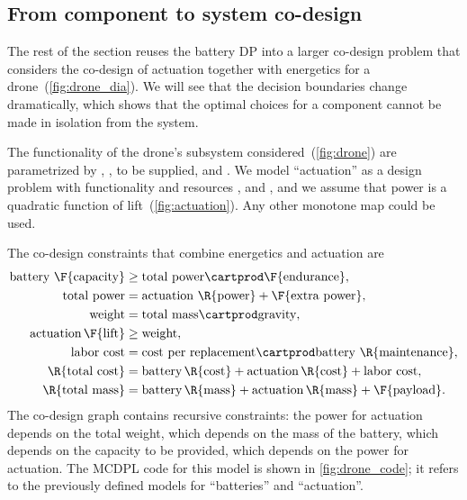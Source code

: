 \subsection{From component to system co-design}

The rest of the section reuses the battery DP into a larger co-design
problem that considers the co-design of actuation together with energetics
for a drone~(\cref{fig:drone_dia}). We will see that the decision
boundaries change dramatically, which shows that the optimal choices
for a component cannot be made in isolation from the system.

The functionality of the drone's subsystem considered~(\cref{fig:drone})
are parametrized by , ,  to be supplied, and . We model ``actuation''
as a design problem with functionality  and resources
,  and , and we assume that power is
a quadratic function of lift~(\cref{fig:actuation}). Any other monotone
map could be used.


\noindent The co-design constraints that combine energetics and actuation
are
    {\small{}
\begin{align}
    \text{battery }\F{\text{capacity}} & \geq\text{total power}\cartprod\F{\text{endurance}},\label{eq:drone_eq_first}\\
    \text{total power} & =\text{actuation }\R{\text{power}}+\F{\text{extra power}},\nonumber \\
    \text{weight} & =\text{total mass}\cartprod\text{gravity},\nonumber \\
    \text{actuation}\,\F{\text{lift}} & \geq\text{weight},\nonumber \\
    \text{labor cost} & =\text{cost per replacement}\cartprod\text{battery }\R{\text{maintenance}},\nonumber \\
    \R{\text{total cost}} & =\text{battery}\,\R{\text{cost}}+\text{actuation}\,\R{\text{cost}}+\text{labor cost},\nonumber \\
    \R{\text{total mass}} & =\text{battery}\,\R{\text{mass}}+\text{actuation}\,\R{\text{mass}}+\F{\text{payload}}.\label{eq:drone_eq_last}
\end{align}
}
The co-design graph contains recursive constraints: the power for
actuation depends on the total weight, which depends on the mass of
the battery, which depends on the capacity to be provided, which depends
on the power for actuation. The MCDPL code for this model is shown
in \cref{fig:drone_code}; it refers to the previously defined models
for ``batteries'' and ``actuation''.

